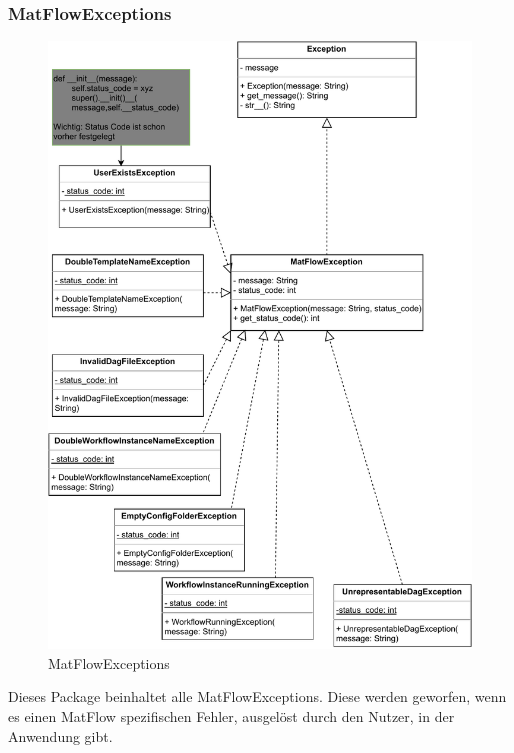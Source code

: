 \subsubsection{MatFlowExceptions}
\begin{figure}[h]
    \includegraphics[width=1\textwidth]{res/Klassen/MatFlowExceptions.drawio.pdf}
    \caption{MatFlowExceptions}
\end{figure}
Dieses Package beinhaltet alle MatFlowExceptions. Diese werden geworfen, wenn es einen MatFlow spezifischen Fehler, ausgelöst 
durch den Nutzer, in der Anwendung gibt.


\newpage